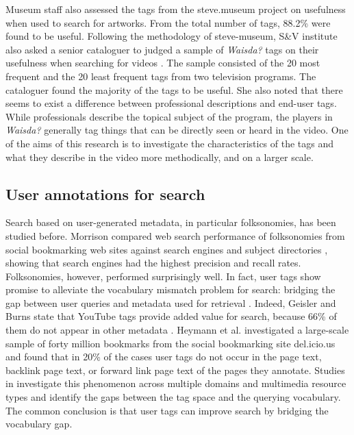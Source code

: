 Museum staff also assessed the tags from the steve.museum project on usefulness when used to search for artworks. From the total number of tags, 88.2\% were found to be useful. Following the methodology of steve-museum, S\&V institute also asked a senior cataloguer to judged a sample of \textit{Waisda?} tags on their usefulness when searching for videos \cite{johanwebsci}. The sample consisted of the 20 most frequent and the 20 least frequent tags from two television programs. The cataloguer found the majority of the tags to be useful. She also noted that there seems to exist a difference between professional descriptions and end-user tags. While professionals describe the topical subject of the program, the players in \textit{Waisda?} generally tag things that can be directly seen or heard in the video. One of the aims of this research is to investigate the characteristics of the tags and what they describe in the video more methodically, and on a larger scale.

\subsection{User annotations for search}
Search based on user-generated metadata, in particular folksonomies, has been studied before. Morrison compared web search performance of folksonomies from social bookmarking web sites against search engines and subject directories \cite{morison}, showing that search engines had the highest precision and recall rates. Folksonomies, however, performed surprisingly well. In fact, user tags show promise to alleviate the vocabulary mismatch problem for search: bridging the gap between user queries and metadata used for retrieval \cite{vocprob}. Indeed, Geisler and Burns state that YouTube tags provide added value for search, because 66\% of them do not appear in  other metadata \cite{youtube}. Heymann et al. investigated a large-scale sample of forty million bookmarks from the social bookmarking site del.icio.us and found that in 20\% of the cases user tags do not occur in the page text, backlink page text, or forward link page text of the pages they annotate. Studies in \cite{Bischoff:2010:BGT:1833903.1834001,Halvey:2007:AOV:1286240.1286301,journals/jasis/Rorissa10,Yanbe:2007:SBE:1255175.1255198} investigate this phenomenon across multiple domains and multimedia resource types and identify the gaps between the tag space and the querying vocabulary. The common conclusion is that user tags can improve search by bridging the vocabulary gap. 

